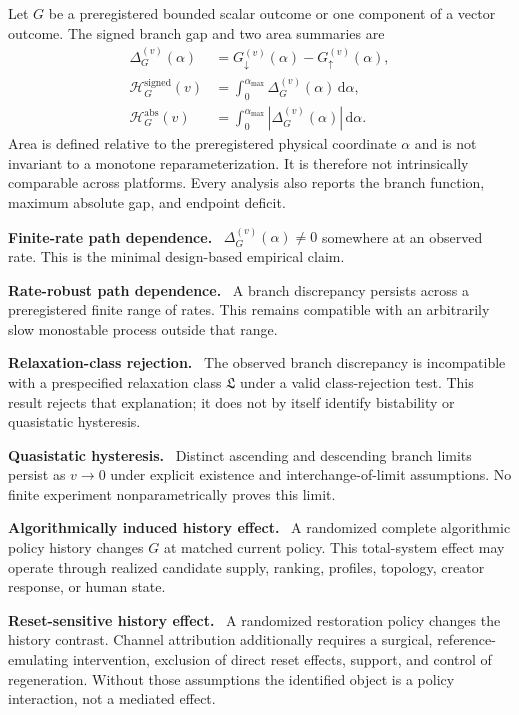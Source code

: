 \documentclass[pdflatex,sn-mathphys-num]{sn-jnl}
\newcommand{\alphamax}{\alpha_{\max}}
\newcommand{\dd}{\mathrm{d}}
\newcommand{\inlinehead}[1]{\par\smallskip\noindent\textbf{#1}\ }
\begin{document}
Let $G$ be a preregistered bounded scalar outcome or one component of a vector outcome. The signed branch gap and two area summaries are
\begin{align}
\Delta_G^{(v)}(\alpha)
  &=G_{\downarrow}^{(v)}(\alpha)-G_{\uparrow}^{(v)}(\alpha),\\
\mathcal H_G^{\mathrm{signed}}(v)
  &=\int_{0}^{\alphamax}\Delta_G^{(v)}(\alpha)\,\dd\alpha,\\
\mathcal H_G^{\mathrm{abs}}(v)
  &=\int_{0}^{\alphamax}|\Delta_G^{(v)}(\alpha)|\,\dd\alpha.
\end{align}
Area is defined relative to the preregistered physical coordinate $\alpha$ and is not invariant to a monotone reparameterization. It is therefore not intrinsically comparable across platforms. Every analysis also reports the branch function, maximum absolute gap, and endpoint deficit.

\inlinehead{Finite-rate path dependence.} $\Delta_G^{(v)}(\alpha)\neq0$ somewhere at an observed rate. This is the minimal design-based empirical claim.

\inlinehead{Rate-robust path dependence.} A branch discrepancy persists across a preregistered finite range of rates. This remains compatible with an arbitrarily slow monostable process outside that range.

\inlinehead{Relaxation-class rejection.} The observed branch discrepancy is incompatible with a prespecified relaxation class $\mathfrak L$ under a valid class-rejection test. This result rejects that explanation; it does not by itself identify bistability or quasistatic hysteresis.

\inlinehead{Quasistatic hysteresis.} Distinct ascending and descending branch limits persist as $v\rightarrow0$ under explicit existence and interchange-of-limit assumptions. No finite experiment nonparametrically proves this limit.

\inlinehead{Algorithmically induced history effect.} A randomized complete algorithmic policy history changes $G$ at matched current policy. This total-system effect may operate through realized candidate supply, ranking, profiles, topology, creator response, or human state.

\inlinehead{Reset-sensitive history effect.} A randomized restoration policy changes the history contrast. Channel attribution additionally requires a surgical, reference-emulating intervention, exclusion of direct reset effects, support, and control of regeneration. Without those assumptions the identified object is a policy interaction, not a mediated effect.
\end{document}
